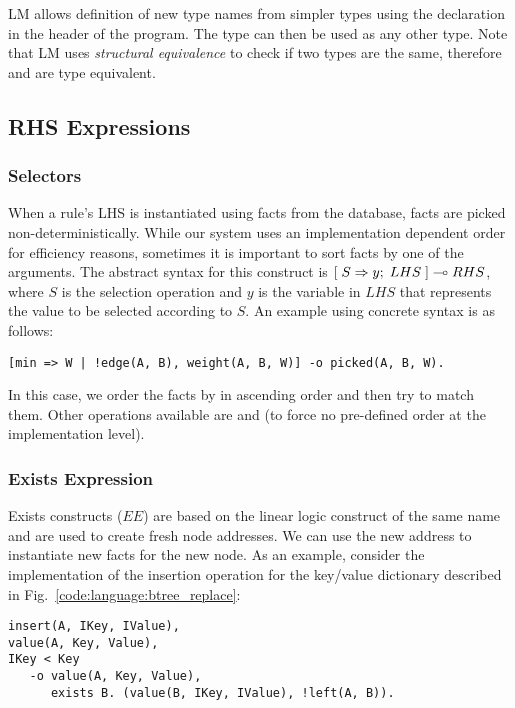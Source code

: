 LM allows definition of new type names from simpler types using the declaration
 in the header of the program. The type
 can then be used as any other type. Note that LM uses
\emph{structural equivalence} to check if two types are the same, therefore
 and  are type equivalent.

\subsection{RHS Expressions}\label{section:language:expressions}

\subsubsection{Selectors}

When a rule's LHS is instantiated using facts from the database, facts are
picked non-deterministically. While our system uses an implementation dependent
order for efficiency reasons, sometimes it is important to sort facts by one of
the arguments. The abstract syntax for this construct is
$[\; S \Rightarrow y; \; LHS \;] \multimap RHS$, where $S$ is the selection operation and $y$ is the
variable in $LHS$ that represents the value to be selected according to $S$. An
example using concrete syntax is as follows:

\begin{Verbatim}[fontsize=\codesize]
[min => W | !edge(A, B), weight(A, B, W)] -o picked(A, B, W).
\end{Verbatim}

In this case, we order the  facts by  in ascending order
and then try to match them. Other operations available are  and
 (to force no pre-defined order at the implementation level).

\subsubsection{Exists Expression}

Exists constructs ($EE$) are based on the linear logic construct of the same name
and are used to create fresh node addresses. We can use the new address to
instantiate new facts for the new node. As an example, consider the implementation of the
insertion operation for the key/value dictionary described in
Fig.~\ref{code:language:btree_replace}:

\begin{Verbatim}[fontsize=\codesize]
insert(A, IKey, IValue),
value(A, Key, Value),
IKey < Key
   -o value(A, Key, Value),
      exists B. (value(B, IKey, IValue), !left(A, B)).
\end{Verbatim}

